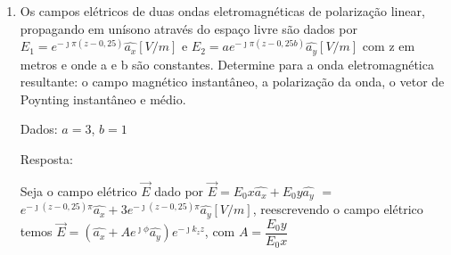 \begin{enumerate}[1.]
\item Os campos elétricos de duas ondas eletromagnéticas de polarização linear, propagando em unísono através do espaço livre são dados por $E_{1} = e^{-\jmath \pi (z - 0,25)} \hat{a_{x}} [V/m]$ e $E_{2} = ae^{-\jmath \pi (z - 0,25b)} \hat{a_{y}} [V/m]$ com z em metros e onde a e b são constantes. Determine para a onda eletromagnética resultante: o campo magnético instantâneo, a polarização da onda, o vetor de Poynting instantâneo e médio.  
  

    Dados: $a = 3$, $b = 1$


    Resposta:

    Seja o campo elétrico $\vec{E}$ dado por $\vec{E} = E_{0}x \hat{a_{x}} + E_{0}y \hat{a_{y}}$  $=$ $e^{-\jmath (z - 0,25) \pi} \hat{a_{x}} + 3 e^{-\jmath (z - 0,25)\pi} \hat{a_{y}} [V/m]$, reescrevendo o campo elétrico temos $\vec{E} = (\hat{a_{x}} + A e^{\jmath \phi} \hat{a_{y}})e^{-\jmath k_{z} z}$, com $A = \dfrac{E_{0}y}{E_{0}x}$

\end{enumerate}


